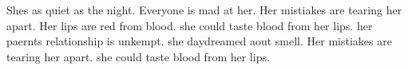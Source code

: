 

Shes as quiet as the night.
Everyone is mad at her.
Her mistiakes are tearing her apart.
Her lips are red from blood.
she could taste blood from her lips.
her paernts relationship is unkempt.
she daydreamed aout smell.
Her mistiakes are tearing her apart.
she could taste blood from her lips.



